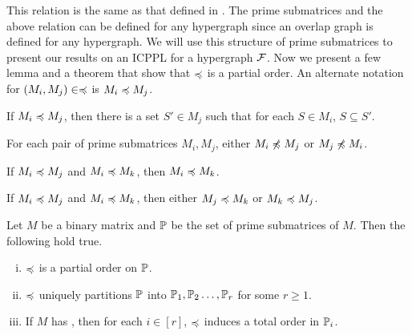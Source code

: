 
This relation is the same as that defined in \cite{nsnrs09}. The prime
submatrices and the above relation can be defined for any hypergraph
since an overlap graph is defined for any hypergraph. We will use this structure of prime submatrices to present our
results on an ICPPL for a hypergraph ${\cal F}$. 
Now we present a few lemma and a theorem that show that $\preccurlyeq$ is
a partial order. An alternate notation for $(M_i,M_j) \in \preccurlyeq$
is $M_i \preccurlyeq M_j$.


\begin{lemma} %
  \label{lem:containment} If %
  $M_i \preccurlyeq M_j$, then there is a set $S' \in M_j$ such that for
  each $S \in M_i$, $S \subseteq S'$.
\end{lemma}
\begin{lemma} %
  For each pair of prime submatrices $M_i, M_j$, either $M_i \not\preccurlyeq M_j$
  or $M_j \not\preccurlyeq M_i$.
\end{lemma}
\begin{lemma} %
  If $M_i \preccurlyeq M_j$ and $M_i \preccurlyeq M_k$,
  then $M_i \preccurlyeq M_k$.
\end{lemma}
\begin{lemma} %
  If $M_i \preccurlyeq M_j$ and $M_i \preccurlyeq M_k$,
  then either $M_j \preccurlyeq M_k$ or $M_k \preccurlyeq M_j$.
\end{lemma}

\begin{theorem}  %
  \label{thm:partitionold} %
  Let $M$ be a binary matrix and $\mathbb P$ be the set of prime submatrices
  of $M$. Then the following hold true.
  \parindent {}
  \begin{enumerate}[i. ]
  \item $\preccurlyeq$ is a partial order on $\mathbb P$.
  \item $\preccurlyeq$ uniquely partitions $\mathbb P$ into $\mathbb P_1, \mathbb P_2
    \ldots ,\mathbb P_r$ for some $r \ge 1$.
  \item \label{thm:i:totalorder} If $M$ has \COP, then for each $i \in
    [r]$, $\preccurlyeq$ induces a total order in $\mathbb P_i$.
  \end{enumerate}
\end{theorem}

